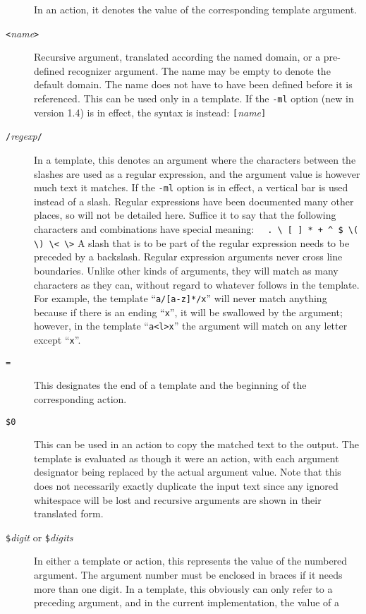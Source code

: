 \begin{description}
In an action, it denotes the value of the corresponding template argument.
\item[{\tt <}{\it name}{\tt >}]
Recursive argument, translated according the named domain,
or a pre-defined recognizer argument.  The name may be empty to denote
the default domain.
The name does not have to have been defined before it is referenced.
This can be used only in a template.
If the \verb/-ml/ option (new in version 1.4) is in effect, the syntax is
instead:  \verb/[/{\it name}\verb/]/
\item[{\tt /}{\it regexp}{\tt /}]
In a template, this denotes an argument where
the characters between the slashes are used as a regular expression,
and the argument value is however much text it matches.
If the \verb/-ml/ option is in effect, a vertical bar is used instead of a
slash. 
Regular expressions have been documented many other places, so will not
be detailed here.  Suffice it to say that the following characters and
combinations have special meaning:\newline
\verb|  . \ [ ] * + ^ $ \( \) \< \>|
\newline
A slash that is to be part of the regular expression needs to be
preceded by a backslash.
Regular expression arguments never cross line boundaries.
Unlike other kinds of arguments, they will match as many characters as
they can, without regard to whatever follows in the template.
For example, the template ``\verb|a/[a-z]*/x|'' will never match anything
because if there is an ending ``\verb/x/'', it will be swallowed by the
argument; however, in the template ``\verb|a<l>x|'' the argument will match
on any letter except ``\verb/x/''.
\item[{\tt =}]
This designates the end of a template and the beginning of the
corresponding action.
\item[{\tt \$0}]
This can be used in an action to copy the matched text to the output.
The template is evaluated as though it were an action, with each
argument designator being replaced by the actual argument value.
Note that this does not necessarily exactly duplicate the input text
since any ignored whitespace will be lost and recursive arguments are shown in
their translated form.
\item[{\tt \$}{\it digit} or {\tt \$\ttlb}{\it digits}{\tt \ttrb}]
In either a template or action, this represents the value of the
numbered argument.  The argument number must be enclosed in braces if it
needs more than one digit.  In a template, this obviously can only refer
to a preceding argument, and in the current implementation, the value of a

\end{description}
